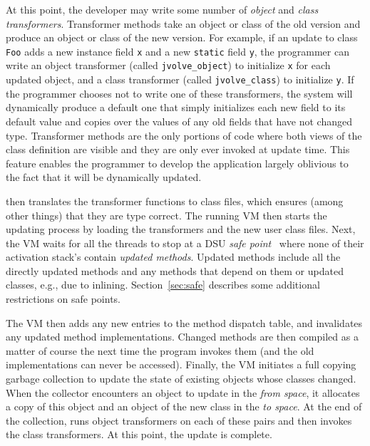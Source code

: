At this point, the developer may write some number of \emph{object}
and \emph{class transformers}.
Transformer methods take an object or class of the old version and
produce an object or class of the new version.  For example, if an
update to class \texttt{Foo} adds a new instance field \texttt{x} and
a new \texttt{static} field \texttt{y}, the programmer can write an
object transformer (called \texttt{jvolve\_object}) to initialize
\texttt{x} for each updated object, and a class transformer (called
\texttt{jvolve\_class}) to initialize \texttt{y}.  If the programmer
chooses not to write one of these transformers, the system will
dynamically produce a default one that simply initializes each new field to its
default value and copies over the values of any old fields that have
not changed type.  Transformer methods are the only portions of code
where both views of the class definition are visible and they are only
ever invoked at update time.  This feature enables the programmer to
develop the application largely oblivious to the fact that it will be
dynamically updated.


\DSU{} then translates the transformer functions to class files, which
ensures (among other things) that they are type correct.  The running
VM then starts the updating process by loading the transformers and the new
user class files.
  Next, the VM waits for all the threads to
stop at a DSU \emph{safe point}~\cite{HicksNettles03,neamtiu06dsu}
where none of their activation stack's
contain \emph{updated methods}. Updated methods include all the
directly updated methods and any methods that depend on them or
updated classes, e.g., due to inlining. Section~\ref{sec:safe}
describes some additional restrictions on safe points.  

The VM then adds any new entries to the method dispatch table, 
and invalidates any updated method implementations.  Changed methods
are then compiled as 
a matter of course the next time the program invokes them (and the old
implementations can never be accessed).  Finally,
the VM initiates a full copying garbage collection to update the state
of existing objects whose classes changed.  When the collector
encounters an object to update in the \emph{from space}, it allocates a copy
of this object and an object of the new class in the \emph{to space}. At the
end of the collection, \DSU{} runs object transformers on
each of these pairs and then invokes the class transformers.
At this point, the update is complete.

